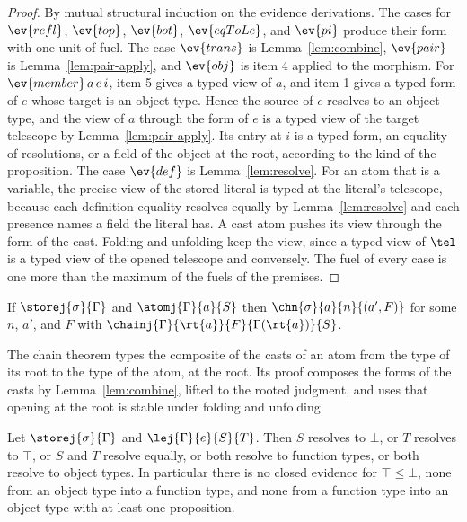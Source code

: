 \begin{proof}
By mutual structural induction on the evidence derivations. The cases for $\ev{refl}$, $\ev{top}$, $\ev{bot}$, $\ev{eqToLe}$, and $\ev{pi}$ produce their form with one unit of fuel. The case $\ev{trans}$ is Lemma~\ref{lem:combine}, $\ev{pair}$ is Lemma~\ref{lem:pair-apply}, and $\ev{obj}$ is item 4 applied to the morphism. For $\ev{member}\,a\,e\,i$, item 5 gives a typed view of $a$, and item 1 gives a typed form of $e$ whose target is an object type. Hence the source of $e$ resolves to an object type, and the view of $a$ through the form of $e$ is a typed view of the target telescope by Lemma~\ref{lem:pair-apply}. Its entry at $i$ is a typed form, an equality of resolutions, or a field of the object at the root, according to the kind of the proposition. The case $\ev{def}$ is Lemma~\ref{lem:resolve}. For an atom that is a variable, the precise view of the stored literal is typed at the literal's telescope, because each definition equality resolves equally by Lemma~\ref{lem:resolve} and each presence names a field the literal has. A cast atom pushes its view through the form of the cast. Folding and unfolding keep the view, since a typed view of $\tel$ is a typed view of the opened telescope and conversely. The fuel of every case is one more than the maximum of the fuels of the premises.
\end{proof}

\begin{theorem}\label{thm:chain}
If $\storej{\sigma}{\Gamma}$ and $\atomj{\Gamma}{a}{S}$ then $\chn{\sigma}{a}{n}{(a', F)}$ for some $n$, $a'$, and $F$ with $\chainj{\Gamma}{\rt{a}}{F}{\Gamma(\rt{a})}{S}$.
\end{theorem}

The chain theorem types the composite of the casts of an atom from the type of its root to the type of the atom, at the root. Its proof composes the forms of the casts by Lemma~\ref{lem:combine}, lifted to the rooted judgment, and uses that opening at the root is stable under folding and unfolding.

\begin{corollary}\label{cor:shapes}
Let $\storej{\sigma}{\Gamma}$ and $\lej{\Gamma}{e}{S}{T}$. Then $S$ resolves to $\bot$, or $T$ resolves to $\top$, or $S$ and $T$ resolve equally, or both resolve to function types, or both resolve to object types. In particular there is no closed evidence for $\top \le \bot$, none from an object type into a function type, and none from a function type into an object type with at least one proposition.
\end{corollary}

